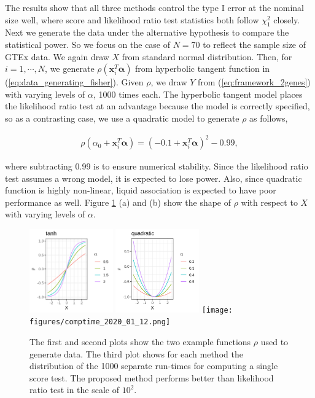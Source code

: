 \documentclass[aap,authoryear, preprint]{imsart}
\numberwithin{equation}{section}
\theoremstyle{plain}
\begin{document}
The results show that all three methods control the type I error at the nominal size well, where score and likelihood ratio test statistics both follow $\chi_1^2$ closely. \\

Next we generate the data under the alternative hypothesis to compare the statistical power. So we focus on the case of $N=70$ to reflect the sample size of GTEx data. We again draw $X$ from standard normal distribution. Then, for $i = 1, \cdots, N$, we generate $\rho(\bm{x}_i^T\bm{\alpha})$ from hyperbolic tangent function in (\ref{eq:data_generating_fisher}). Given $\rho$, we draw $Y$ from (\ref{eq:framework_2genes}) with varying levels of $\alpha$, 1000 times each. The hyperbolic tangent model places the likelihood ratio test at an advantage because the model is correctly specified, so as a contrasting case, we use a quadratic model to generate $\rho$ as follows,

\begin{align}
    \rho(\alpha_0 + \bm{x}_i^T\bm{\alpha}) = ( - 0.1 + \bm{x}_i^T\bm{\alpha})^2 - 0.99,
    \label{eq:data_generating2_quadratic}
\end{align}

\noindent where subtracting 0.99 is to ensure numerical stability. Since the likelihood ratio test assumes a wrong model, it is expected to lose power. Also, since quadratic function is highly non-linear, liquid association is expected to have poor performance as well. Figure \ref{fig:sim} (a) and (b) show the shape of $\rho$ with respect to $X$ with varying levels of $\alpha$. \\
\begin{figure}
         \includegraphics[width=0.32\textwidth]{figures/tanh.png}
         \includegraphics[width=0.32\textwidth]{figures/quadratic.png}
        \texttt{[image: figures/comptime\_2020\_01\_12.png]}
        \caption{The first and second plots show the two example functions $\rho$ used to generate data. The third plot shows for each method the distribution of the 1000 separate run-times for computing a single score test. The proposed method performs better than likelihood ratio test in the scale of $10^2$.}
        \label{fig:sim}
\end{figure}
\end{document}
